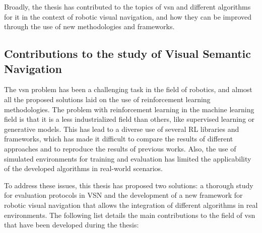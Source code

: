 Broadly, the thesis has contributed to the topics of \acrfull{vsn} and different algorithms for it in the context of robotic visual navigation, and how they can be improved through the use of new methodologies and frameworks.

\subsection{Contributions to the study of Visual Semantic Navigation}\label{subsec:contributions-to-visual-semantic-navigation}

The \acrshort{vsn} problem has been a challenging task in the field of robotics, and almost all the proposed solutions laid on the use of reinforcement learning methodologies.
The problem with reinforcement learning in the machine learning field is that it is a less industrialized field than others, like supervised learning or generative models.
This has lead to a diverse use of several \acrshort{RL} libraries and frameworks, which has made it difficult to compare the results of different approaches and to reproduce the results of previous works.
Also, the use of simulated environments for training and evaluation has limited the applicability of the developed algorithms in real-world scenarios.

To address these issues, this thesis has proposed two solutions: a thorough study for evaluation protocols in \acrshort{VSN} and the development of a new framework for robotic visual navigation that allows the integration of different algorithms in real environments.
The following list details the main contributions to the field of \acrshort{vsn} that have been developed during the thesis:

